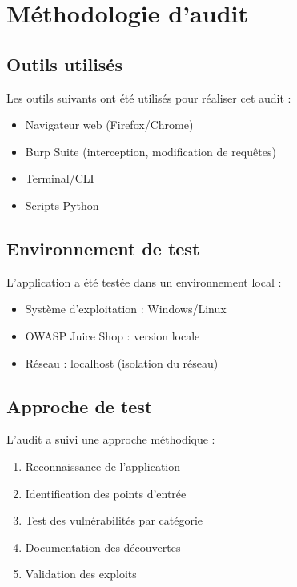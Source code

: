 
\chapter{Méthodologie d'audit}

\section{Outils utilisés}
Les outils suivants ont été utilisés pour réaliser cet audit :
\begin{itemize}
    \item Navigateur web (Firefox/Chrome)
    \item Burp Suite (interception, modification de requêtes)
    \item Terminal/CLI
    \item Scripts Python
\end{itemize}

\section{Environnement de test}
L'application a été testée dans un environnement local :
\begin{itemize}
    \item Système d'exploitation : Windows/Linux
    \item OWASP Juice Shop : version locale
    \item Réseau : localhost (isolation du réseau)
\end{itemize}

\section{Approche de test}
L'audit a suivi une approche méthodique :
\begin{enumerate}
    \item Reconnaissance de l'application
    \item Identification des points d'entrée
    \item Test des vulnérabilités par catégorie
    \item Documentation des découvertes
    \item Validation des exploits
\end{enumerate}
